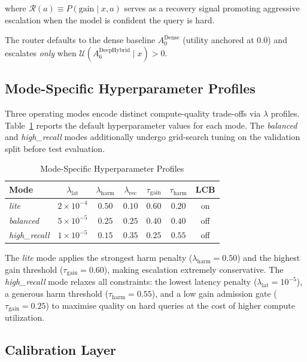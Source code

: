 \documentclass[journal]{IEEEtran}
\begin{document}
where $\mathcal{R}(a) \equiv P(\text{gain} \mid x, a)$ serves as a
recovery signal promoting aggressive escalation when the model is
confident the query is hard.

The router defaults to the dense baseline $A_0^{\text{Dense}}$
(utility anchored at $0.0$) and escalates \emph{only} when
$\mathcal{U}(A_6^{\text{DeepHybrid}} \mid x) > 0$.

\subsection{Mode-Specific Hyperparameter Profiles}
\label{sec:modes}

Three operating modes encode distinct compute-quality trade-offs
via $\lambda$ profiles. Table~\ref{tab:modes} reports the
default hyperparameter values for each mode. The \textit{balanced}
and \textit{high\_recall} modes additionally undergo grid-search
tuning on the validation split before test evaluation.

\begin{table}[h]
\centering
\caption{Mode-Specific Hyperparameter Profiles}
\label{tab:modes}
\begin{tabular}{lcccccc}
\toprule
Mode & $\lambda_{\text{lat}}$ & $\lambda_{\text{harm}}$ &
      $\lambda_{\text{rec}}$ & $\tau_{\text{gain}}$ &
      $\tau_{\text{harm}}$ & LCB \\
\midrule
\textit{lite}        & $2\!\times\!10^{-4}$ & $0.50$ & $0.10$ & $0.60$ & $0.20$ & on  \\
\textit{balanced}    & $5\!\times\!10^{-5}$ & $0.25$ & $0.25$ & $0.40$ & $0.40$ & off \\
\textit{high\_recall} & $1\!\times\!10^{-5}$ & $0.15$ & $0.35$ & $0.25$ & $0.55$ & off \\
\bottomrule
\end{tabular}
\end{table}

The \textit{lite} mode applies the strongest harm penalty
($\lambda_{\text{harm}} = 0.50$) and the highest gain threshold
($\tau_{\text{gain}} = 0.60$), making escalation extremely
conservative. The \textit{high\_recall} mode relaxes all
constraints: the lowest latency penalty ($\lambda_{\text{lat}} =
10^{-5}$), a generous harm threshold ($\tau_{\text{harm}} = 0.55$),
and a low gain admission gate ($\tau_{\text{gain}} = 0.25$) to
maximise quality on hard queries at the cost of higher
compute utilization.

\subsection{Calibration Layer}
\label{sec:calibration}
\end{document}
